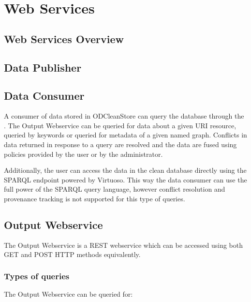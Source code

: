 
\chapter{Web Services}

\section{Web Services Overview}

\section{Data Publisher}

\section{Data Consumer}

A consumer of data stored in ODCleanStore can query the database through the . The Output Webservice can be queried for data about a given URI resource, queried by keywords or queried for metadata of a given named graph. Conflicts in data returned in response to a query are resolved and the data are fused using policies provided by the user or by the administrator.

Additionally, the user can access the data in the clean database directly using the SPARQL endpoint powered by Virtuoso. This way the data consumer can use the full power of the SPARQL query language, however conflict resolution and provenance tracking is not supported for this type of queries.

\section*{Output Webservice}

The Output Webservice is a REST webservice which can be accessed using both GET and POST HTTP methods equivalently.

\subsection{Types of queries}

The Output Webservice can be queried for:

